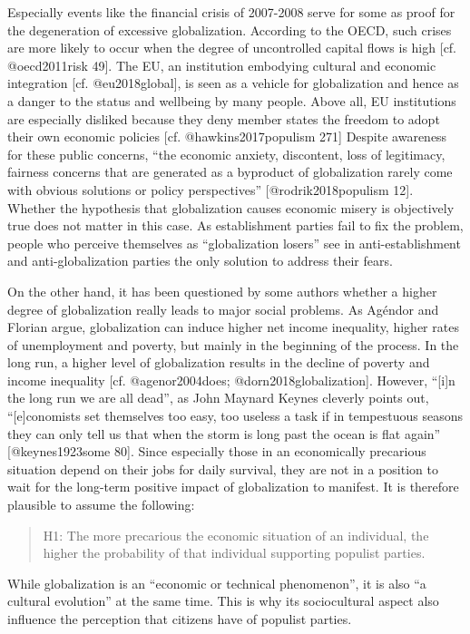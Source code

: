\documentclass[]{article}
\begin{document}
Especially events like the financial crisis of 2007-2008 serve for some
as proof for the degeneration of excessive globalization. According to
the OECD, such crises are more likely to occur when the degree of
uncontrolled capital flows is high {[}cf. @oecd2011risk 49{]}. The EU,
an institution embodying cultural and economic integration {[}cf.
@eu2018global{]}, is seen as a vehicle for globalization and hence as a
danger to the status and wellbeing by many people. Above all, EU
institutions are especially disliked because they deny member states the
freedom to adopt their own economic policies {[}cf. @hawkins2017populism
271{]} Despite awareness for these public concerns, ``the economic
anxiety, discontent, loss of legitimacy, fairness concerns that are
generated as a byproduct of globalization rarely come with obvious
solutions or policy perspectives'' {[}@rodrik2018populism 12{]}. Whether
the hypothesis that globalization causes economic misery is objectively
true does not matter in this case. As establishment parties fail to fix
the problem, people who perceive themselves as ``globalization losers''
see in anti-establishment and anti-globalization parties the only
solution to address their fears.

On the other hand, it has been questioned by some authors whether a
higher degree of globalization really leads to major social problems. As
Agéndor and Florian argue, globalization can induce higher net income
inequality, higher rates of unemployment and poverty, but mainly in the
beginning of the process. In the long run, a higher level of
globalization results in the decline of poverty and income inequality
{[}cf. @agenor2004does; @dorn2018globalization{]}. However, ``{[}i{]}n
the long run we are all dead'', as John Maynard Keynes cleverly points
out, ``{[}e{]}conomists set themselves too easy, too useless a task if
in tempestuous seasons they can only tell us that when the storm is long
past the ocean is flat again'' {[}@keynes1923some 80{]}. Since
especially those in an economically precarious situation depend on their
jobs for daily survival, they are not in a position to wait for the
long-term positive impact of globalization to manifest. It is therefore
plausible to assume the following:

\begin{quote}
H1: The more precarious the economic situation of an individual, the
higher the probability of that individual supporting populist parties.
\end{quote}

While globalization is an ``economic or technical phenomenon'', it is
also ``a cultural evolution'' at the same time. This is why its
sociocultural aspect also influence the perception that citizens have of
populist parties.
\end{document}
